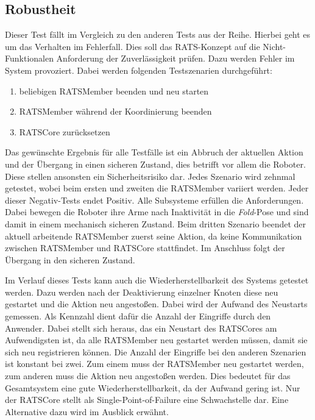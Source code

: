 \subsection{Robustheit}
Dieser Test fällt im Vergleich zu den anderen Tests aus der Reihe. Hierbei geht es um das Verhalten im Fehlerfall. Dies soll das RATS-Konzept auf die Nicht-Funktionalen Anforderung der Zuverlässigkeit prüfen. Dazu werden Fehler im System provoziert. Dabei werden folgenden Testszenarien durchgeführt:

\begin{enumerate}
	\item beliebigen RATSMember beenden und neu starten
	\item RATSMember während der Koordinierung beenden
	\item RATSCore zurücksetzen
\end{enumerate}

Das gewünschte Ergebnis für alle Testfälle ist ein Abbruch der aktuellen Aktion und der Übergang in einen sicheren Zustand, dies betrifft vor allem die Roboter. Diese stellen ansonsten ein Sicherheitsrisiko dar. Jedes Szenario wird zehnmal getestet, wobei beim ersten und zweiten die RATSMember variiert werden. Jeder dieser Negativ-Tests endet Positiv. Alle Subsysteme erfüllen die Anforderungen. Dabei bewegen die Roboter ihre Arme nach Inaktivität in die \textit{Fold}-Pose und sind damit in einem mechanisch sicheren Zustand. Beim dritten Szenario beendet der aktuell arbeitende RATSMember zuerst seine Aktion, da keine Kommunikation zwischen RATSMember und RATSCore stattfindet. Im Anschluss folgt der Übergang in den sicheren Zustand.

Im Verlauf dieses Tests kann auch die Wiederherstellbarkeit des Systems getestet werden. Dazu werden nach der Deaktivierung einzelner Knoten diese neu gestartet und die Aktion neu angestoßen. Dabei wird der Aufwand des Neustarts gemessen. Als Kennzahl dient dafür die Anzahl der Eingriffe durch den Anwender. Dabei stellt sich heraus, das ein Neustart des RATSCores am Aufwendigsten ist, da alle RATSMember neu gestartet werden müssen, damit sie sich neu registrieren können. Die Anzahl der Eingriffe bei den anderen Szenarien ist konstant bei zwei. Zum einem muss der RATSMember neu gestartet werden, zum anderen muss die Aktion neu angestoßen werden. Dies bedeutet für das Gesamtsystem eine gute Wiederherstellbarkeit, da der Aufwand gering ist. Nur der RATSCore stellt als Single-Point-of-Failure eine Schwachstelle dar. Eine Alternative dazu wird im Ausblick erwähnt.


